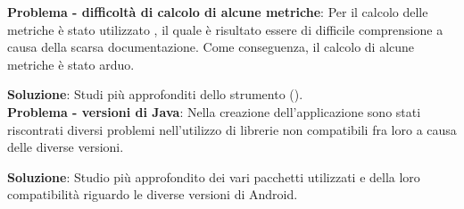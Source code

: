 \textbf{Problema - difficoltà di calcolo di alcune metriche}: Per il calcolo delle metriche è stato utilizzato , il quale è risultato essere di difficile comprensione a causa della scarsa documentazione. Come conseguenza, il calcolo di alcune metriche è stato arduo.

\textbf{Soluzione}: Studi più approfonditi dello strumento ().\\

\textbf{Problema - versioni di Java}: Nella creazione dell'applicazione sono stati riscontrati diversi problemi nell'utilizzo di librerie non compatibili fra loro a causa delle diverse versioni.

\textbf{Soluzione}: Studio più approfondito dei vari pacchetti utilizzati e della loro compatibilità riguardo le diverse versioni di Android.


